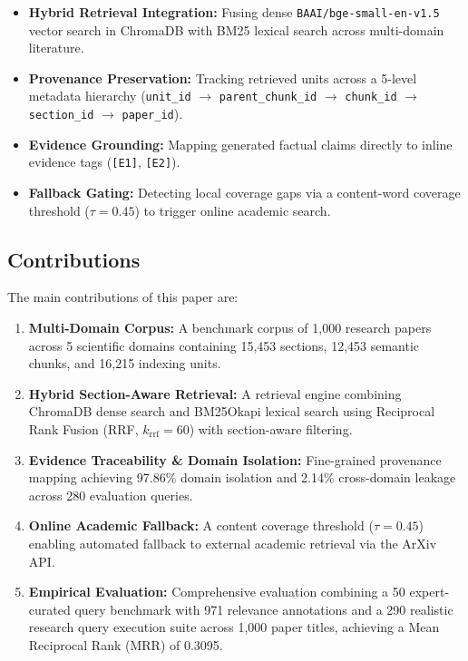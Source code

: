 \documentclass[conference]{IEEEtran}
\begin{document}
\begin{itemize}
    \item \textbf{Hybrid Retrieval Integration:} Fusing dense \texttt{BAAI/bge-small-en-v1.5} vector search in ChromaDB with BM25 lexical search across multi-domain literature.
    
    \item \textbf{Provenance Preservation:} Tracking retrieved units across a 5-level metadata hierarchy (\texttt{unit\_id} $\rightarrow$ \texttt{parent\_chunk\_id} $\rightarrow$ \texttt{chunk\_id} $\rightarrow$ \texttt{section\_id} $\rightarrow$ \texttt{paper\_id}).
    
    \item \textbf{Evidence Grounding:} Mapping generated factual claims directly to inline evidence tags (\texttt{[E1]}, \texttt{[E2]}).
    
    \item \textbf{Fallback Gating:} Detecting local coverage gaps via a content-word coverage threshold ($\tau = 0.45$) to trigger online academic search.
\end{itemize}

\subsection{Contributions}

The main contributions of this paper are:

\begin{enumerate}
    \item \textbf{Multi-Domain Corpus:} A benchmark corpus of 1,000 research papers across 5 scientific domains containing 15,453 sections, 12,453 semantic chunks, and 16,215 indexing units.
    
    \item \textbf{Hybrid Section-Aware Retrieval:} A retrieval engine combining ChromaDB dense search and BM25Okapi lexical search using Reciprocal Rank Fusion (RRF, $k_{\text{rrf}} = 60$) with section-aware filtering.
    
    \item \textbf{Evidence Traceability \& Domain Isolation:} Fine-grained provenance mapping achieving 97.86\% domain isolation and 2.14\% cross-domain leakage across 280 evaluation queries.
    
    \item \textbf{Online Academic Fallback:} A content coverage threshold ($\tau = 0.45$) enabling automated fallback to external academic retrieval via the ArXiv API.
    
    \item \textbf{Empirical Evaluation:} Comprehensive evaluation combining a 50 expert-curated query benchmark with 971 relevance annotations and a 290 realistic research query execution suite across 1,000 paper titles, achieving a Mean Reciprocal Rank (MRR) of 0.3095.
\end{enumerate}
\end{document}
